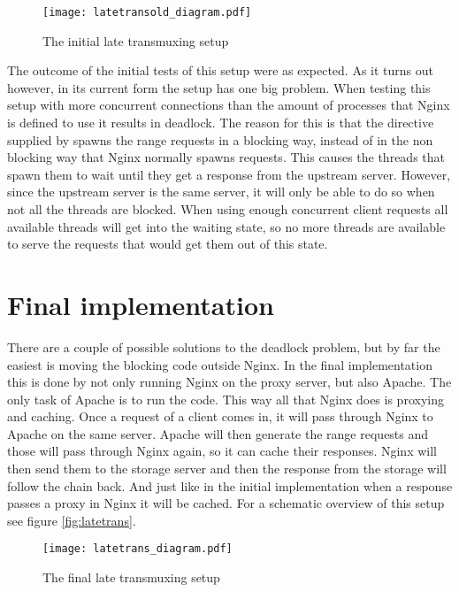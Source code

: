 \documentclass[twoside,openright]{uva-bachelor-thesis}
\begin{document}
\begin{figure}
    \texttt{[image: latetransold\_diagram.pdf]}
    \caption{The initial late transmuxing setup}\label{fig:latetransold}
\end{figure}

\label{par:deadlock}
The outcome of the initial tests of this setup were as expected. As it turns out
however, in its current form the setup has one big problem. When testing this
setup with more concurrent connections than the amount of processes that
Nginx is defined to use it results in deadlock. The reason for this is that the
\ipplong directive supplied by \usp spawns the range requests in a blocking way,
instead of in the non blocking way that Nginx normally spawns requests. This
causes the threads that spawn them to wait until they get a response from the
upstream server. However, since the upstream server is the same server, it will
only be able to do so when not all the threads are blocked. When using enough
concurrent client requests all available threads will get into the waiting
state, so no more threads are available to serve the requests that would get
them out of this state.

\section{Final implementation}
There are a couple of possible solutions to the deadlock problem, but by far the
easiest is moving the blocking code outside Nginx. In the final implementation
this is done by not only running Nginx on the proxy server, but also Apache. The
only task of Apache is to run the \ipplong code. This way all that Nginx does is
proxying and caching. Once a request of a client comes in, it will pass
through Nginx to Apache on the same server. Apache will then generate the range
requests and those will pass through Nginx again, so it can cache their
responses. Nginx will then send them to the storage server and then the response
from the storage will follow the chain back. And just like in the initial
implementation when a response passes a proxy in Nginx it will be cached. For a
schematic overview of this setup see figure \vref{fig:latetrans}.


\begin{figure}
    \texttt{[image: latetrans\_diagram.pdf]}
    \caption{The final late transmuxing setup}\label{fig:latetrans}
\end{figure}
\end{document}
